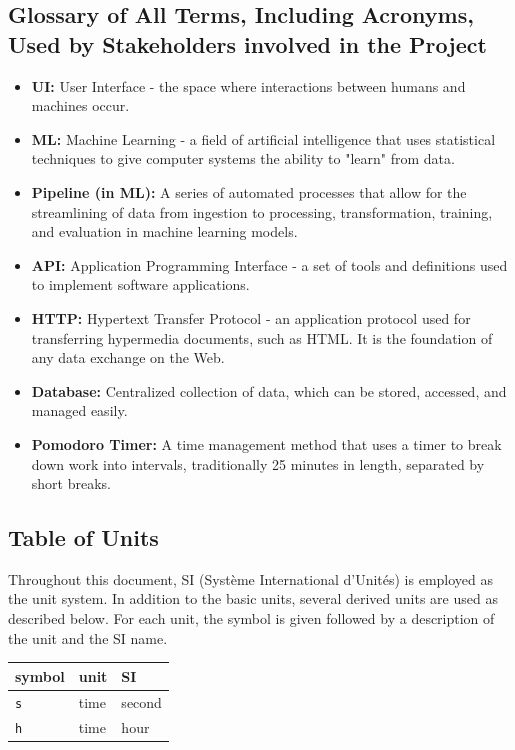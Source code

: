 \documentclass[12pt]{article}
\begin{document}
\subsection{Glossary of All Terms, Including Acronyms, Used by Stakeholders involved in the Project}
\begin{itemize}
    \item \textbf{UI:} User Interface - the space where interactions between humans and machines occur.
    \item \textbf{ML:} Machine Learning - a field of artificial intelligence that uses statistical techniques to give computer systems the ability to "learn" from data.
    \item \textbf{Pipeline (in ML):} A series of automated processes that allow for the streamlining of data from ingestion to processing, transformation, training, and evaluation in machine learning models.
    \item \textbf{API:} Application Programming Interface - a set of tools and definitions used to implement software applications.
    \item \textbf{HTTP:} Hypertext Transfer Protocol - an application protocol used for transferring hypermedia documents, such as HTML. It is the foundation of any data exchange on the Web.
    \item \textbf{Database:} Centralized collection of data, which can be stored, accessed, and managed easily.
    \item \textbf{Pomodoro Timer:} A time management method that uses a timer to break down work into intervals, traditionally 25 minutes in length, separated by short breaks.
\end{itemize}
\subsection{Table of Units}

Throughout this document, SI (Syst\`{e}me International d'Unit\'{e}s) is employed
as the unit system.  In addition to the basic units, several derived units are
used as described below.  For each unit, the symbol is given followed by a
description of the unit and the SI name.

\begin{center}
    \begin{tabular}{ |l|l|l|  }
    
    \hline
    symbol & unit & SI \\
    \hline
    \texttt{s} & time & second\\
    \hline
    \texttt{h} & time & hour\\
    \hline
    \end{tabular}
    \end{center}
\end{document}
